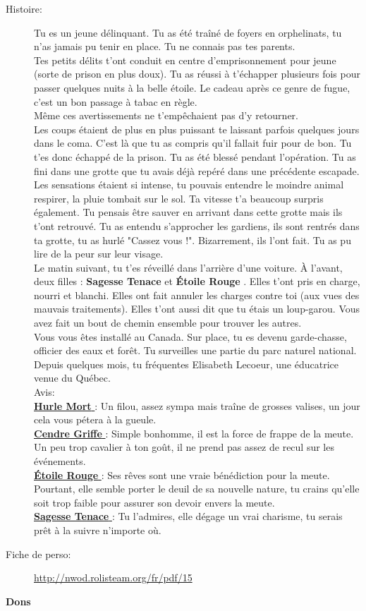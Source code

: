 \documentclass[oneside,12pt]{book}
\newcommand{\Lynn}{\textbf{Étoile Rouge} }
\newcommand{\Jessica}{\textbf{Sagesse Tenace} }
\newcommand{\Luke}{\textbf{Cendre Griffe} }
\newcommand{\Peter}{\textbf{Hurle Mort} }
\begin{document}
\begin{flushleft}
\begin{description}
\item[Histoire:]{
Tu es un jeune délinquant. Tu as été traîné de foyers en orphelinats, tu n'as jamais pu tenir en place. 
Tu ne connais pas tes parents.\\ 
Tes petits délits t'ont conduit en centre d'emprisonnement pour jeune (sorte de prison en plus doux). 
Tu as réussi à t'échapper plusieurs fois pour passer quelques nuits à la belle étoile. 
Le cadeau après ce genre de fugue, c'est un bon passage à tabac en règle. \\
Même ces avertissements ne t'empêchaient pas d'y retourner. \\
Les coups étaient de plus en plus puissant te laissant parfois quelques jours dans le coma. 
C'est là que tu as compris qu'il fallait fuir pour de bon. Tu t'es donc échappé de la prison. 
Tu as été blessé pendant l'opération. Tu as fini dans une grotte que tu avais déjà repéré dans une précédente escapade. Les sensations étaient si intense, tu pouvais entendre le moindre animal respirer, la pluie tombait sur le sol. Ta vitesse t'a beaucoup surpris également. Tu pensais être sauver en arrivant dans cette grotte mais ils t'ont retrouvé.
Tu as entendu s'approcher les gardiens, ils sont rentrés dans ta grotte, tu as hurlé "Cassez vous !". 
Bizarrement, ils l'ont fait. Tu as pu lire de la peur sur leur visage. \\
Le matin suivant, tu t'es réveillé dans l'arrière d'une voiture. À l'avant, deux filles : \Jessica et \Lynn. Elles t'ont pris en charge, nourri et blanchi. 
Elles ont fait annuler les charges contre toi (aux vues des mauvais traitements). Elles t'ont aussi dit que tu étais un loup-garou. Vous avez fait un bout de chemin ensemble pour trouver les autres. \\
Vous vous êtes installé au Canada. Sur place, tu es devenu garde-chasse, officier des eaux et forêt. Tu surveilles une  partie du parc naturel national. \\ 
Depuis quelques mois, tu fréquentes Elisabeth Lecoeur, une éducatrice venue du Québec.\\ 
Avis:\\
\underline{\Peter} : Un filou, assez sympa mais traîne de grosses valises, un jour cela vous pétera à la gueule.\\
\underline{\Luke} : Simple bonhomme, il est la force de frappe de la meute. Un peu trop cavalier à ton goût, il ne prend pas assez de recul sur les événements.\\
\underline{\Lynn}  : Ses rêves sont une vraie bénédiction pour la meute. Pourtant, elle semble porter le deuil de sa nouvelle nature, tu crains qu'elle soit trop faible pour assurer son devoir envers la meute.\\
\underline{\Jessica}: Tu l'admires, elle dégage un vrai charisme, tu serais prêt à la suivre n'importe où.\\
}
\item[Fiche de perso:]{\href{http://nwod.rolisteam.org/fr/pdf/15}{http://nwod.rolisteam.org/fr/pdf/15}}
\end{description}
\clearpage
\textbf{\large Dons} 
\vspace{0.5cm}


\end{flushleft}
\end{document}
